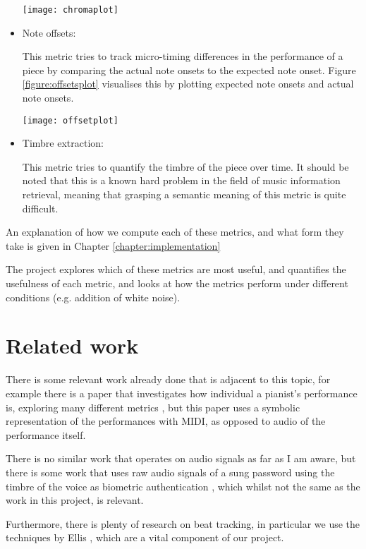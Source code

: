 \documentclass[oneside, class=book, crop=false, 12pt]{standalone}
\begin{document}
\begin{itemize}
    \begin{minipage}{\textwidth}
      \centering
      \texttt{[image: chromaplot]}
      \label{figure:chromaplot}
        
    \end{minipage}

  \item
    Note offsets:

    This metric tries to track micro-timing differences in the performance of a piece by comparing the actual note onsets to the expected note onset. Figure \ref{figure:offsetsplot} visualises this by plotting expected note onsets and actual note onsets.

\begin{minipage}{\textwidth}
  \centering
  \texttt{[image: offsetplot]}
  \label{figure:offsetsplot}
\end{minipage}



  \item
    Timbre extraction:

    This metric tries to quantify the timbre of the piece over time. It should be noted that this is a known hard problem in the field of music information retrieval, meaning that grasping a semantic meaning of this metric is quite difficult.
\end{itemize}





An explanation of how we compute each of these metrics, and what form they take is given in Chapter \ref{chapter:implementation}

The project explores which of these metrics are most useful, and quantifies the usefulness of each metric, and looks at how the metrics perform under different conditions (e.g. addition of white noise).


\section{Related work}

There is some relevant work already done that is adjacent to this topic, for example there is a paper that investigates how individual a pianist's performance is, exploring many different metrics \cite{bernays14}, but this paper uses a symbolic representation of the performances with MIDI, as opposed to audio of the performance itself.

There is no similar work that operates on audio signals as far as I am aware, but there is some work that uses raw audio signals of a sung password using the timbre of the voice as biometric authentication \cite{prakash16}, which whilst not the same as the work in this project, is relevant.

Furthermore, there is plenty of research on beat tracking, in particular we use the techniques by Ellis \cite{ellis07}, which are a vital component of our project.


\ifstandalone
  \printbibliography[heading=subbibliography]
\fi
    
\end{document}
